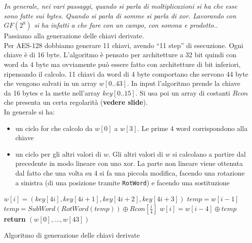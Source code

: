\documentclass[a4paper,12pt, oneside]{book}
\begin{document}
\textit{In generale, nei vari passaggi, quando si parla di moltiplicazioni si ha
  che esse sono fatte sui bytes. Quando si parla di somme si parla di
  xor. Lavorando con $GF(2^8)$ si ha infatti a che fare con un campo, con somma
  e prodotto.}.\\
Passiamo alla generazione delle chiavi derivate.\\
Per AES-128 dobbiamo generare 11 chiavi, avendo ``11 step'' di esecuzione. Ogni
chiave è di 16 byte. L'algoritmo è pensato per architetture a 32 bit quindi con
word da 4 byte ma ovviamente può essere fatto con architetture di bit inferiori,
ripensando il calcolo. 11 chiavi da word di 4 byte comportano che servono 44
byte che vengono salvati in un array $w[0..43]$. In input l'algoritmo prende la
chiave da 16 bytes e la mette nell'array $key[0..15]$. Si usa poi un array di
costanti $Rcon$ che presenta un certa regolarità (\textbf{vedere slide}).\\
In generale si ha:
\begin{itemize}
  \item un ciclo for che calcolo da $w[0]$ a $w[3]$. Le prime 4 word
  corrispondono alla chiave
  \item un ciclo per gli altri valori di $w$. Gli altri valori di $w$ si
  calcolano a partire dal precedente in modo lineare con uno xor. La parte non
  lineare viene ottenuta dal fatto che una volta su 4 si fa una piccola
  modifica, facendo una rotazione a sinistra (di una posizione tramite
  \texttt{RotWord}) e facendo una sostituzione
\end{itemize}
\begin{algorithm}
  \begin{algorithmic}
    \State $w[i]=(key[4i],key[4i+1],key[4i+2],key[4i+3])$
    \EndFor
    \State $temp=w[i-1]$
    \State $temp=SubWord(RotWord(temp))\oplus Rcon\left[\frac{i}{4}\right]$
    \EndIf
    \State $w[i]=w[i-4]\oplus temp$
    \EndFor
    \State \textbf{return} $(w[0],\ldots, w[43])$
    \EndFunction
  \end{algorithmic}
  \caption{Algoritmo di generazione delle chiavi derivate}
\end{algorithm}
\end{document}
